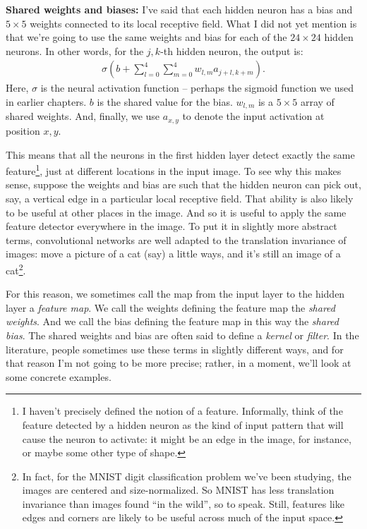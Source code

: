 \documentclass[a4paper,twoside,10pt]{book}
\begin{document}
\textbf{Shared weights and biases:} I've said that each hidden neuron has a bias and $5\times5$ weights connected to its local receptive field. What I did not yet mention is that we're going to use the same weights and bias for each of the $24\times24$ hidden neurons. In other words, for the $j,k$-th hidden neuron, the output is:
\begin{eqnarray} 
\sigma\left(b + \sum_{l=0}^4 \sum_{m=0}^4  w_{l,m} a_{j+l, k+m} \right).\label{eq:125}
\end{eqnarray}
Here, $\sigma$ is the neural activation function -- perhaps the sigmoid function we used in earlier chapters. $b$ is the shared value for the bias. $w_{l,m}$ is a $5\times5$ array of shared weights. And, finally, we use $a_{x,y}$ to denote the input activation at position $x,y$.

This means that all the neurons in the first hidden layer detect exactly the same feature\footnote{I haven't precisely defined the notion of a feature. Informally, think of the feature detected by a hidden neuron as the kind of input pattern that will cause the neuron to activate: it might be an edge in the image, for instance, or maybe some other type of shape.}, just at different locations in the input image. To see why this makes sense, suppose the weights and bias are such that the hidden neuron can pick out, say, a vertical edge in a particular local receptive field. That ability is also likely to be useful at other places in the image. And so it is useful to apply the same feature detector everywhere in the image. To put it in slightly more abstract terms, convolutional networks are well adapted to the translation invariance of images: move a picture of a cat (say) a little ways, and it's still an image of a cat\footnote{In fact, for the MNIST digit classification problem we've been studying, the images are centered and size-normalized. So MNIST has less translation invariance than images found ``in the wild'', so to speak. Still, features like edges and corners are likely to be useful across much of the input space.}.

For this reason, we sometimes call the map from the input layer to the hidden layer a \textit{feature map}. We call the weights defining the feature map the \textit{shared weights}. And we call the bias defining the feature map in this way the \textit{shared bias}. The shared weights and bias are often said to define a \textit{kernel} or \textit{filter}. In the literature, people sometimes use these terms in slightly different ways, and for that reason I'm not going to be more precise; rather, in a moment, we'll look at some concrete examples.
\end{document}
